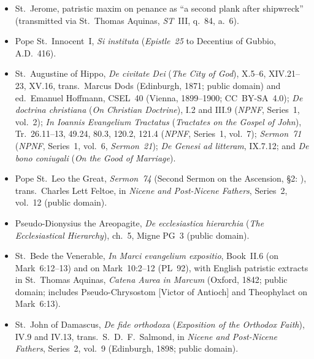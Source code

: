 \begin{itemize}
\item St.~Jerome, patristic maxim on penance as ``a second plank after shipwreck'' (transmitted via St.~Thomas Aquinas, \emph{ST}~III, q.~84, a.~6).
\item Pope St.~Innocent~I, \emph{Si instituta} (\emph{Epistle~25} to Decentius of Gubbio, A.D.~416).
\item St.~Augustine of Hippo, \emph{De civitate Dei} (\emph{The City of God}), X.5--6, XIV.21--23, XV.16, trans.\ Marcus Dods (Edinburgh, 1871; public domain) and ed.\ Emanuel Hoffmann, CSEL~40 (Vienna, 1899--1900; CC~BY-SA~4.0); \emph{De doctrina christiana} (\emph{On Christian Doctrine}), I.2 and III.9 (\emph{NPNF}, Series~1, vol.~2); \emph{In Ioannis Evangelium Tractatus} (\emph{Tractates on the Gospel of John}), Tr.~26.11--13, 49.24, 80.3, 120.2, 121.4 (\emph{NPNF}, Series~1, vol.~7); \emph{Sermon~71} (\emph{NPNF}, Series~1, vol.~6, \emph{Sermon~21}); \emph{De Genesi ad litteram}, IX.7.12; and \emph{De bono coniugali} (\emph{On the Good of Marriage}).
\item Pope St.~Leo the Great, \emph{Sermon~74} (Second Sermon on the Ascension, \S2: ), trans.\ Charles Lett Feltoe, in \emph{Nicene and Post-Nicene Fathers}, Series~2, vol.~12 (public domain).
\item Pseudo-Dionysius the Areopagite, \emph{De ecclesiastica hierarchia} (\emph{The Ecclesiastical Hierarchy}), ch.~5, Migne PG~3 (public domain).
\item St.~Bede the Venerable, \emph{In Marci evangelium expositio}, Book~II.6 (on Mark~6:12--13) and on Mark~10:2--12 (PL~92), with English patristic extracts in St.~Thomas Aquinas, \emph{Catena Aurea in Marcum} (Oxford, 1842; public domain; includes Pseudo-Chrysostom [Victor of Antioch] and Theophylact on Mark~6:13).
\item St.~John of Damascus, \emph{De fide orthodoxa} (\emph{Exposition of the Orthodox Faith}), IV.9 and IV.13, trans.\ S.~D.~F.~Salmond, in \emph{Nicene and Post-Nicene Fathers}, Series~2, vol.~9 (Edinburgh, 1898; public domain).
\end{itemize}

